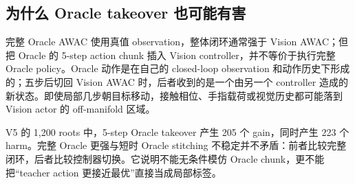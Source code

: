 \hypertarget{ux4e3aux4ec0ux4e48-oracle-takeover-ux4e5fux53efux80fdux6709ux5bb3}{%
\subsection{为什么 Oracle takeover 也可能有害}\label{ux4e3aux4ec0ux4e48-oracle-takeover-ux4e5fux53efux80fdux6709ux5bb3}}

完整 Oracle AWAC 使用真值 observation，整体闭环通常强于 Vision AWAC；但把 Oracle 的 5-step action chunk 插入 Vision controller，并不等价于执行完整 Oracle policy。Oracle 动作是在自己的 closed-loop observation 和动作历史下形成的；五步后切回 Vision AWAC 时，后者收到的是一个由另一个 controller 造成的新状态。即使局部几步朝目标移动，接触相位、手指载荷或视觉历史都可能落到 Vision actor 的 off-manifold 区域。

V5 的 1,200 roots 中，5-step Oracle takeover 产生 205 个 gain，同时产生 223 个 harm。完整 Oracle 更强与短时 Oracle stitching 不稳定并不矛盾：前者比较完整闭环，后者比较控制器切换。它说明不能无条件模仿 Oracle chunk，更不能把``teacher action 更接近最优''直接当成局部标签。
